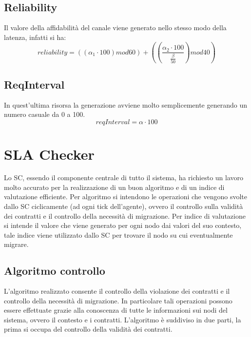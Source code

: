 \subsection{Reliability}
Il valore della affidabilità del canale viene generato nello stesso modo della latenza, infatti si ha:
\begin{equation}
reliability = ((\alpha_{1} \cdot 100)mod60) + \left( \left(\frac{\alpha_{2} \cdot 100}{\frac{\beta}{50}}\right)mod40\right)
\end{equation}
\subsection{ReqInterval}
In quest'ultima risorsa la generazione avviene molto semplicemente generando un numero casuale da 0 a 100.
\begin{equation}
reqInterval = \alpha \cdot 100
\end{equation}
\section{SLA Checker}
Lo SC, essendo il componente centrale di tutto il sistema, ha richiesto un lavoro molto accurato per la realizzazione di un buon algoritmo e di un indice di valutazione efficiente. Per algoritmo si intendono le operazioni che vengono svolte dallo SC ciclicamente (ad ogni tick dell'agente), ovvero il controllo sulla validità dei contratti e il controllo della necessità di migrazione. Per indice di valutazione si intende il valore che viene generato per ogni nodo dai valori del suo contesto, tale indice viene utilizzato dallo SC per trovare il nodo su cui eventualmente migrare.
\subsection{Algoritmo controllo}
L'algoritmo realizzato consente il controllo della violazione dei contratti e il controllo della necessità di migrazione. In particolare tali operazioni possono essere effettuate grazie alla conoscenza di tutte le informazioni sui nodi del sistema, ovvero il contesto e i contratti. L'algoritmo è suddiviso in due parti, la prima si occupa del controllo della validità dei contratti.
